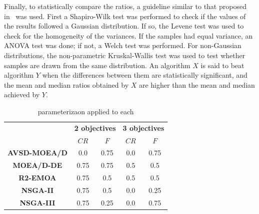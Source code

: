 Finally, to statistically compare the \HV{} ratios, a guideline similar to that proposed in~\cite{durillo2010study} was used.
%
First a Shapiro-Wilk test was performed to check if the values of the results followed a Gaussian distribution.
%
If so, the Levene test was used to check for the homogeneity of the variances.
%
If the samples had equal variance, an ANOVA test was done; if not, a Welch test was performed.
%
For non-Gaussian distributions, the non-parametric Kruskal-Wallis test was used to test whether samples are drawn from the same distribution.
%
An algorithm $X$ is said to beat algorithm $Y$ when the differences between them are statistically significant, and the mean and median \HV{} ratios
obtained by $X$ are higher than the mean and median achieved by $Y$.


\begin{table}[t]
\centering
\caption{\DE{} parameterizaon applied to each \MOEA{}}
\label{tab:tunning}
\begin{tabular}{c|c|c|c|c}
\hline
\multirow{2}{*}{}   & \multicolumn{2}{c|}{\textbf{2 objectives}} & \multicolumn{2}{c}{\textbf{3 objectives}} \\ \cline{2-5} 
                    & $CR$                 & $F$                 & $CR$                 & $F$                 \\ \hline
\textbf{AVSD-MOEA/D} & 0.0                  & 0.75                & 0.0                  & 0.75                \\ \hline
\textbf{MOEA/D-DE}  & 0.75                 & 0.75                & 0.5                  & 0.5                 \\ \hline
\textbf{R2-EMOA}    & 0.75                 & 0.5                 & 0.5                  & 0.5                 \\ \hline
\textbf{NSGA-II}    & 0.75                 & 0.5                 & 0.0                  & 0.25                 \\ \hline
\textbf{NSGA-III}   & 0.75                  & 0.25                 & 0.0                  & 0.75                 \\ \hline
\end{tabular}%
\end{table}

